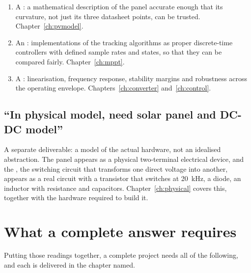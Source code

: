 \begin{enumerate}[leftmargin=1.6em]
  \item A : a mathematical description of the panel
        accurate enough that its curvature, not just its three datasheet points,
        can be trusted. Chapter~\ref{ch:pvmodel}.
  \item An : implementations of the tracking algorithms as
        proper discrete-time controllers with defined sample rates and states,
        so that they can be compared fairly. Chapter~\ref{ch:mppt}.
  \item A : linearisation, frequency response, stability
        margins and robustness across the operating envelope.
        Chapters~\ref{ch:converter} and~\ref{ch:control}.
\end{enumerate}

\subsection{``In physical model, need solar panel and DC-DC model''}

A separate deliverable: a model of the actual hardware, not an idealised
abstraction. The panel appears as a physical two-terminal electrical device, and
the , the switching circuit that transforms one direct
voltage into another, appears as a real circuit with a transistor that switches
at \SI{20}{\kilo\hertz}, a diode, an inductor with resistance and capacitors.
Chapter~\ref{ch:physical} covers this, together with the hardware required to
build it.

\section{What a complete answer requires}

Putting those readings together, a complete project needs all of the following,
and each is delivered in the chapter named.

